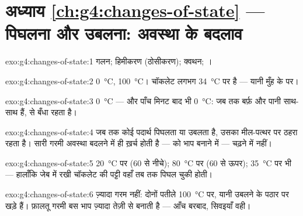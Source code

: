 \section*{अध्याय \ref{ch:g4:changes-of-state} --- पिघलना और उबलना: अवस्था के बदलाव}

\begin{solution}{exo:g4:changes-of-state:1}
गलन; हिमीकरण (ठोसीकरण); क्वथन; ।
\end{solution}

\begin{solution}{exo:g4:changes-of-state:2}
 \qty{0}{\celsius},  \qty{100}{\celsius}। चॉकलेट
लगभग \qty{34}{\celsius} पर  है --- यानी मुँह के  पर।
\end{solution}

\begin{solution}{exo:g4:changes-of-state:3}
\qty{0}{\celsius} --- और पाँच मिनट बाद भी \qty{0}{\celsius}: जब तक
बर्फ़ और पानी साथ-साथ हैं,   से बँधा रहता है।
\end{solution}

\begin{solution}{exo:g4:changes-of-state:4}
जब तक कोई पदार्थ पिघलता या उबलता है, उसका  मील-पत्थर पर ठहरा रहता
है। सारी गरमी अवस्था बदलने में ही ख़र्च होती है ---  को भाप बनाने
में --- चढ़ने में नहीं।
\end{solution}

\begin{solution}{exo:g4:changes-of-state:5}
\qty{20}{\celsius} पर  ($60$ से नीचे); \qty{80}{\celsius} पर
 ($60$ से ऊपर); \qty{35}{\celsius} पर भी  --- हालाँकि जेब
में रखी चॉकलेट की पट्टी वहाँ तब तक पिघल चुकी होती।
\end{solution}

\begin{solution}{exo:g4:changes-of-state:6}
ज़्यादा गरम नहीं: दोनों पतीले \qty{100}{\celsius} पर, यानी उबलने के
पठार पर खड़े हैं। फ़ालतू गरमी बस भाप ज़्यादा तेज़ी से बनाती है ---
आँच बरबाद, सिवइयाँ वही।
\end{solution}


